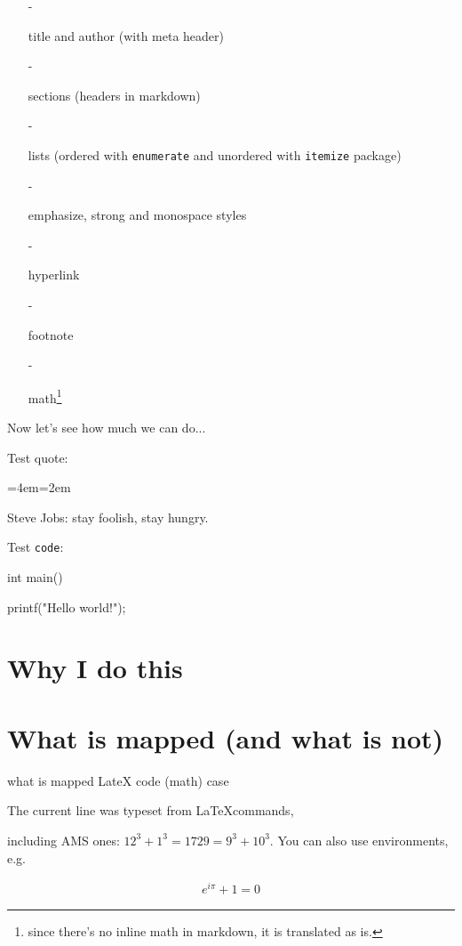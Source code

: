 \documentclass[a4paper, 11pt, titlepage, openany]{article}
\newenvironment{blockquote}{%
  \par%
  \medskip
  \leftskip=4em\rightskip=2em%
  \noindent\ignorespaces}{%
  \par\medskip}
\begin{document}
\begin{itemize}
    \item[-] 

title and author (with meta header)
    \item[-] 

sections (headers in markdown)
    \item[-] 

lists (ordered with \texttt{enumerate} and unordered with \texttt{itemize} package)
    \item[-] 

emphasize, strong and monospace styles
    \item[-] 

hyperlink
    \item[-] 

footnote
    \item[-] 

math\footnote{since there's no inline math in markdown, it is translated as is.}\end{itemize}

Now let's see how much we can do...

Test quote:

\begin{blockquote}

Steve Jobs: stay foolish, stay hungry.\end{blockquote}

Test \texttt{code}:


int main()

{

    printf("Hello world!");

}


\section{Why I do this}

\section{What is mapped (and what is not)}

what is mapped LateX code (math) case 

The current line was typeset from \LaTeX {\fw commands}, 

including AMS ones: $12^3 + 1^3 = 1729 = 9^3 + 10^3$. You can also use environments, e.g.

\begin{align}e^{i\pi} +1 = 0\end{align}
\end{document}
